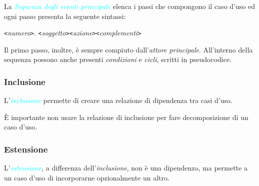 La \emph{\textcolor{cyan}{Sequenza degli eventi principale}} elenca i passi che compongono il caso d'uso ed ogni passo presenta la
seguente sintassi:
\begin{center}
    \verb|<|\emph{numero}\verb|>|. \verb|<|\emph{soggetto}\verb|><|\emph{azione}\verb|><|\emph{complementi}\verb|>|
\end{center}
Il primo passo, inoltre, è sempre compiuto dall'\emph{attore principale}.
All'interno della sequenza possono anche presenti \emph{condizioni} e \emph{cicli}, scritti in pseudocodice.


\subsubsection{Inclusione}

L'\emph{\textcolor{cyan}{inclusione}} permette di creare una relazione di dipendenza tra casi d'uso.

È importante non usare la relazione di inclusione per fare decomposizione di un caso d'uso.

\subsubsection{Estensione}

L'\emph{\textcolor{cyan}{estensione}}, a differenza dell'\emph{inclusione}, non è una dipendenza, ma
permette a un caso d'uso di incorporarne opzionalmente un altro.